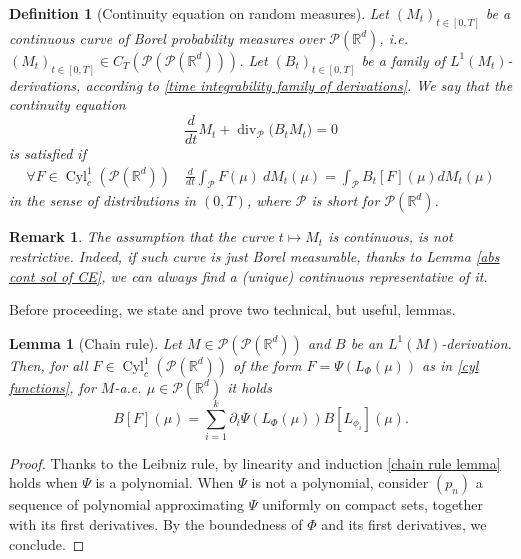 \documentclass[10pt,leqno]{amsart}
\numberwithin{equation}{section}
\newtheorem{lemma}[teorema]{Lemma}
\newtheorem{df}[teorema]{Definition}
\newtheorem{oss}[teorema]{Remark}
\newcommand{\R}{\mathbb{R}}
\newcommand{\PP}{\mathcal{P}}
\begin{document}
\begin{df}[Continuity equation on random measures]\label{def CE}
    Let $(M_t)_{t\in[0,T]}$ be a continuous curve of Borel probability measures over $\mathcal{P}(\R^d)$, i.e. $(M_t)_{t\in[0,T]}\in C_T(\PP(\PP(\R^d)))$. Let $(B_t)_{t\in[0,T]}$ be a family of $L^1(M_t)$-derivations, according to \eqref{time integrability family of derivations}. We say that the continuity equation 
    \begin{equation}\label{CE meas}
        \frac{d}{dt}M_t + \operatorname{div}_{\mathcal{P}}\big( 
        B_t M_t \big)=0
    \end{equation}
    is satisfied if 
    \begin{equation}\label{CE meas 2}
    \begin{aligned}
        \forall F \in \operatorname{Cyl}_c^1(\PP(\R^d)) \quad \frac{d}{dt}\int_{\mathcal{P}} F(\mu) \ dM_t(\mu) 
        = \int_{\mathcal{P}}B_t[F](\mu) dM_t(\mu) 
    \end{aligned}
    \end{equation}
    in the sense of distributions in $(0,T)$, where $\PP$ is short for $\PP(\R^d)$.
\end{df}



\begin{oss}
    The assumption that the curve $t\mapsto M_t$ is continuous, is not restrictive. Indeed, if such curve is just Borel measurable, thanks to Lemma \ref{abs cont sol of CE}, we can always find a (unique) continuous representative of it.
\end{oss}




\noindent Before proceeding, we state and prove two technical, but useful, lemmas.

\begin{lemma}[Chain rule]\label{chain rule}
    Let $M\in \PP(\PP(\R^d))$ and $B$ be an $L^1(M)$-derivation. Then, for all $F\in \operatorname{Cyl}_c^1(\PP(\R^d))$ of the form $F = \Psi (L_\Phi(\mu))$ as in \eqref{cyl functions},  for $M$-a.e. $\mu\in \PP(\R^d)$ it holds 
    \begin{equation}\label{chain rule lemma}
        B[F](\mu) = \sum_{i=1}^k \partial_i\Psi(L_\Phi(\mu)) B[L_{\phi_i}](\mu).
    \end{equation}
\end{lemma}

\begin{proof}
    Thanks to the Leibniz rule, by linearity and induction \eqref{chain rule lemma} holds when $\Psi$ is a polynomial. When $\Psi$ is not a polynomial, consider $(p_n)$ a sequence of polynomial approximating $\Psi$ uniformly on compact sets, together with its first derivatives. By the boundedness of $\Phi $ and its first derivatives, we conclude.
\end{proof}
\end{document}
